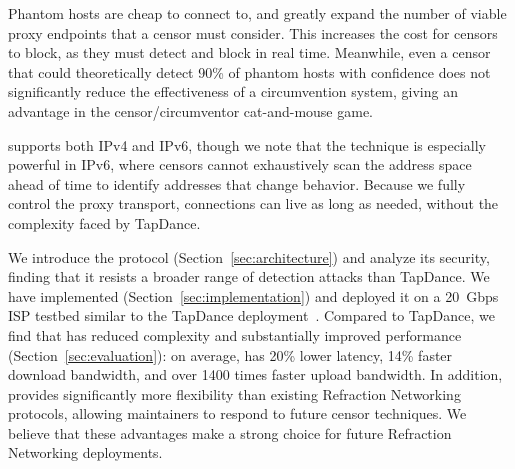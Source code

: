 \documentclass[sigconf]{acmart}
\begin{document}
Phantom hosts are cheap to connect to, and greatly expand the 
number of viable proxy endpoints that a censor must consider. This increases the cost for censors to
block, as they must detect and block in real time. Meanwhile, even a censor that
could theoretically detect 90\% of phantom hosts with confidence does not significantly reduce the
effectiveness of a circumvention system, giving \scheme an advantage in the censor/circumventor
cat-and-mouse game.

\scheme supports both IPv4 and IPv6,
though we note that the technique is especially
powerful in IPv6, where censors cannot exhaustively scan the address space
ahead of time to identify addresses that change behavior.
Because we fully control the proxy transport, connections can live as
long as needed, without the complexity faced by TapDance.




We introduce the \scheme protocol (Section~\ref{sec:architecture})
and analyze its security, finding that it resists a broader
range of detection attacks than TapDance.
We have implemented \scheme (Section~\ref{sec:implementation})
and deployed it on a 20~Gbps ISP testbed similar to the TapDance
deployment~\cite{frolov2017isp}.  Compared to TapDance, we find that
\scheme has reduced complexity and substantially improved performance
(Section~\ref{sec:evaluation}): on average, \scheme has 20\% lower latency,
14\% faster download bandwidth, and over 1400 times faster upload bandwidth.
In addition, \scheme provides significantly
more flexibility than existing Refraction Networking protocols, allowing maintainers to
respond to future censor techniques.
We believe that these advantages
make \scheme a strong choice for future Refraction Networking deployments.

\end{document}
